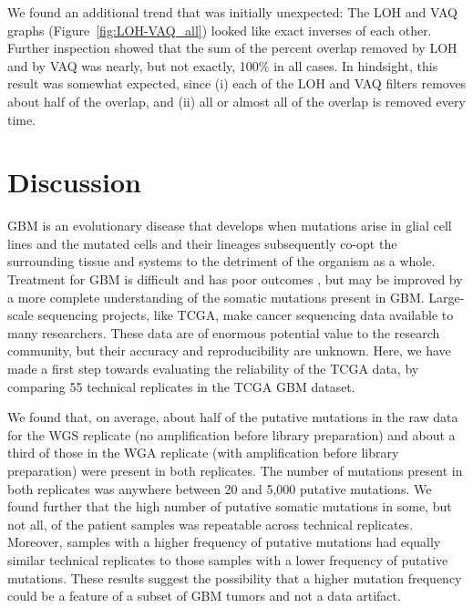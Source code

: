 \documentclass[11 pt]{article} %
\begin{document}
We found an additional trend that was initially unexpected: The LOH and VAQ graphs (Figure~\ref{fig:LOH-VAQ_all}) looked like exact inverses of each other. Further inspection showed that the sum of the percent overlap removed by LOH and by VAQ was nearly, but not exactly, 100\% in all cases. In hindsight, this result was somewhat expected, since (i) each of the LOH and VAQ filters removes about half of the overlap, and (ii) all or almost all of the overlap is removed every time.

\section*{Discussion}

GBM is an evolutionary disease that develops when mutations arise in glial cell lines and the mutated cells and their lineages subsequently co-opt the surrounding tissue and systems to the detriment of the organism as a whole. Treatment for GBM is difficult and has poor outcomes \citep{GBM-stats}, but may be improved by a more complete understanding of the somatic mutations present in GBM. Large-scale sequencing projects, like TCGA, make cancer sequencing data available to many researchers. These data are of enormous potential value to the research community, but their accuracy and reproducibility are unknown. Here, we have made a first step towards evaluating the reliability of the TCGA data, by comparing 55 technical replicates in the TCGA GBM dataset.

We found that, on average, about half of the putative mutations in the raw data for the WGS replicate (no amplification before library preparation) and about a third of those in the WGA replicate (with amplification before library preparation) were present in both replicates. The number of mutations present in both replicates was anywhere between 20 and 5,000 putative mutations. We found further that the high number of putative somatic mutations in some, but not all, of the patient samples was repeatable across technical replicates. Moreover, samples with a higher frequency of putative mutations had equally similar technical replicates to those samples with a lower frequency of putative mutations. These results suggest the possibility that a higher mutation frequency could be a feature of a subset of GBM tumors and not a data artifact.
\end{document}
